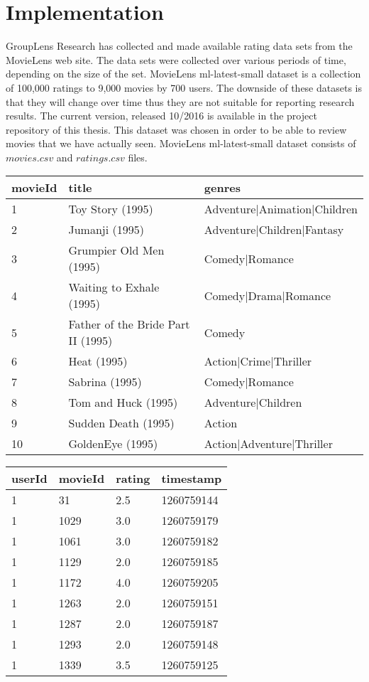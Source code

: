 \documentclass[main.tex]{thesis.tex}
\begin{document}
\chapter{Implementation}

GroupLens Research has collected and made available rating data sets from the MovieLens web site.
The data sets were collected over various periods of time, depending on the size of the set.
MovieLens ml-latest-small dataset is a collection of 100,000 ratings to 9,000 movies by 700 users.
The downside of these datasets is that they will change over time thus they are not suitable for reporting research results.
The current version, released 10/2016 is available in the project repository of this thesis.
This dataset was chosen in order to be able to review movies that we have actually seen.
MovieLens ml-latest-small dataset consists of $movies.csv$ and $ratings.csv$ files.

\begin{tabular}{lll}
	movieId & title & genres \\ \hline
	1 & Toy Story (1995) & Adventure|Animation|Children \\
	2 & Jumanji (1995) & Adventure|Children|Fantasy \\
	3 & Grumpier Old Men (1995) & Comedy|Romance \\
	4 & Waiting to Exhale (1995) & Comedy|Drama|Romance \\
	5 & Father of the Bride Part II (1995) & Comedy \\
	6 & Heat (1995) & Action|Crime|Thriller \\
	7 & Sabrina (1995) & Comedy|Romance \\
	8 & Tom and Huck (1995) & Adventure|Children \\
	9 & Sudden Death (1995) & Action \\
	10 & GoldenEye (1995) & Action|Adventure|Thriller \\
\end{tabular}

\begin{tabular}{llll}
	userId & movieId & rating & timestamp \\ \hline
	1 & 31 & 2.5 & 1260759144 \\
	1 & 1029 & 3.0 & 1260759179 \\
	1 & 1061 & 3.0 & 1260759182 \\
	1 & 1129 & 2.0 & 1260759185 \\
	1 & 1172 & 4.0 & 1260759205 \\
	1 & 1263 & 2.0 & 1260759151 \\
	1 & 1287 & 2.0 & 1260759187 \\
	1 & 1293 & 2.0 & 1260759148 \\
	1 & 1339 & 3.5 & 1260759125 \\
\end{tabular}
\end{document}
